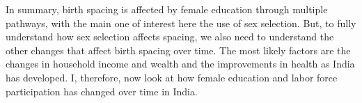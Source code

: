 In summary, birth spacing is affected by female education through 
multiple pathways, with the main one of interest here the use of 
sex selection. 
But, to fully understand how sex selection affects spacing, we also 
need to understand the other changes that affect birth spacing over time.
The most likely factors are the changes in household income and 
wealth and the improvements in health as India has developed.
I, therefore, now look at how female education and labor force 
participation has changed over time in India.


